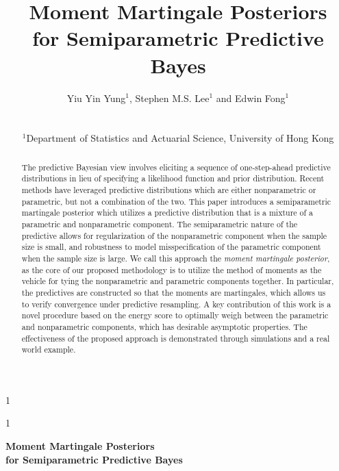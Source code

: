 \documentclass[11pt,a4paper]{article}
\newcommand{\anon}{1}
\theoremstyle{plain}
\theoremstyle{remark}
\theoremstyle{remark}
\begin{document}
\def\spacingset#1{\renewcommand{\baselinestretch}%
{#1}\small\normalsize} \spacingset{1}




\anon
{
  \title{Moment Martingale Posteriors \\ for Semiparametric Predictive Bayes}
  \author{Yiu Yin Yung$^1$, Stephen M.S. Lee$^1$ and Edwin Fong$^1$\\
  \\
  \begin{small}
  $^1$Department of Statistics and Actuarial Science, University of Hong Kong
    \end{small}
}
  \date{}
  \maketitle
} \fi

\anon
{
  \bigskip
  \begin{center}
    {\LARGE\bf Moment Martingale Posteriors \\\vspace{1mm} for Semiparametric Predictive Bayes}
\end{center}
  \medskip
} \fi

\begin{abstract}
The predictive Bayesian view involves eliciting a sequence of one-step-ahead predictive distributions in lieu of specifying a likelihood function and prior distribution. 
Recent methods have leveraged predictive distributions which are either nonparametric or parametric, but not a combination of the two. This paper introduces a semiparametric martingale posterior which utilizes a  predictive distribution that is a mixture of a parametric and nonparametric component. The semiparametric nature of the predictive allows for regularization of the nonparametric component when the sample size is small, and robustness to model misspecification of the parametric component when the sample size is large. We call this approach the \textit{moment martingale posterior}, as the core of our proposed methodology is to utilize the method of moments as the vehicle for tying the nonparametric and parametric components together. In particular, the predictives are constructed so that the moments are martingales, which allows us to verify convergence under predictive resampling. A key contribution of this work is a novel procedure based on the energy score to optimally weigh between the parametric and nonparametric components, which has desirable asymptotic properties. The effectiveness of the proposed approach is demonstrated through simulations and a real world example.\end{abstract}
\end{document}
